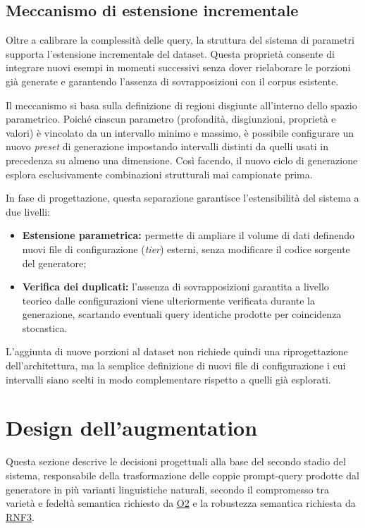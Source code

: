 \documentclass[12pt,a4paper,openright,twoside]{book}
\begin{document}
\subsection{Meccanismo di estensione incrementale}

Oltre a calibrare la complessità delle query, la struttura del sistema di
parametri supporta l'estensione incrementale del dataset. Questa proprietà
consente di integrare nuovi esempi in momenti successivi senza dover rielaborare
le porzioni già generate e garantendo l'assenza di sovrapposizioni con il corpus
esistente.

Il meccanismo si basa sulla definizione di regioni disgiunte all'interno dello
spazio parametrico. Poiché ciascun parametro (profondità, disgiunzioni,
proprietà e valori) è vincolato da un intervallo minimo e massimo, è possibile
configurare un nuovo \textit{preset} di generazione impostando intervalli
distinti da quelli usati in precedenza su almeno una dimensione. Così facendo,
il nuovo ciclo di generazione esplora esclusivamente combinazioni strutturali
mai campionate prima.

In fase di progettazione, questa separazione garantisce l'estensibilità del
sistema a due livelli:
\begin{itemize}
    \item \textbf{Estensione parametrica:} permette di ampliare il volume di
          dati definendo nuovi file di configurazione (\textit{tier}) esterni,
          senza modificare il codice sorgente del generatore;
    \item \textbf{Verifica dei duplicati:} l'assenza di sovrapposizioni
          garantita a livello teorico dalle configurazioni viene ulteriormente
          verificata durante la generazione, scartando eventuali query identiche
          prodotte per coincidenza stocastica.
\end{itemize}

L'aggiunta di nuove porzioni al dataset non richiede quindi una riprogettazione
dell'architettura, ma la semplice definizione di nuovi file di configurazione i
cui intervalli siano scelti in modo complementare rispetto a quelli già
esplorati.

\section{Design dell'augmentation}

Questa sezione descrive le decisioni progettuali alla base del secondo stadio
del sistema, responsabile della trasformazione delle coppie prompt-query
prodotte dal generatore in più varianti linguistiche naturali, secondo il
compromesso tra varietà e fedeltà semantica richiesto da \hyperref[obj:O2]{O2} e
la robustezza semantica richiesta da \hyperref[rnf:RNF3]{RNF3}.
\end{document}
